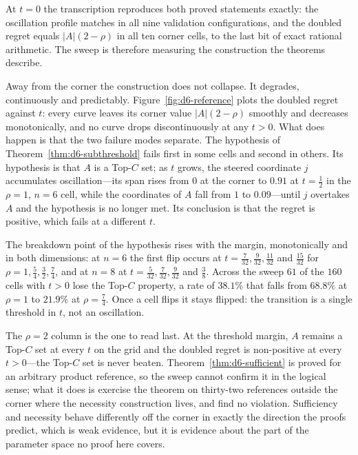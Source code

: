 At $t=0$ the transcription reproduces both proved statements exactly: the oscillation profile
matches  in all nine validation configurations, and the doubled regret
equals $|A|(2-\rho)$ in all ten corner cells, to the last bit of exact rational arithmetic.
The sweep is therefore measuring the construction the theorems describe.

Away from the corner the construction does not collapse. It degrades, continuously and
predictably. Figure~\ref{fig:d6-reference} plots the doubled regret against $t$: every curve
leaves its corner value $|A|(2-\rho)$ smoothly and decreases monotonically, and no curve
drops discontinuously at any $t>0$. What does happen is that the two failure modes separate.
The hypothesis of Theorem~\ref{thm:d6-subthreshold} fails first in some cells and second in
others. Its hypothesis is that $A$ is a Top-$C$ set; as $t$ grows, the steered coordinate $j$
accumulates oscillation---its span rises from $0$ at the corner to $0.91$ at $t=\tfrac12$ in
the $\rho=1$, $n=6$ cell, while the coordinates of $A$ fall from $1$ to $0.09$---until $j$
overtakes $A$ and the hypothesis is no longer met. Its conclusion is that the regret is
positive, which fails at a different $t$.

The breakdown point of the hypothesis rises with the margin, monotonically and in both
dimensions: at $n=6$ the first flip occurs at $t=\tfrac{7}{32},\tfrac{9}{32},\tfrac{11}{32}$
and $\tfrac{15}{32}$ for $\rho=1,\tfrac54,\tfrac32,\tfrac74$, and at $n=8$ at
$t=\tfrac{5}{32},\tfrac{7}{32},\tfrac{9}{32}$ and $\tfrac38$. Across the sweep $61$ of the
$160$ cells with $t>0$ lose the Top-$C$ property, a rate of $38.1\%$ that falls from $68.8\%$
at $\rho=1$ to $21.9\%$ at $\rho=\tfrac74$. Once a cell flips it stays flipped: the
transition is a single threshold in $t$, not an oscillation. \NUM{}

The $\rho=2$ column is the one to read last. At the threshold margin, $A$ remains a Top-$C$
set at every $t$ on the grid and the doubled regret is non-positive at every $t>0$---the
Top-$C$ set is never beaten. Theorem~\ref{thm:d6-sufficient} is proved for an arbitrary product
reference, so the sweep cannot confirm it in the logical sense; what it does is exercise the
theorem on thirty-two references outside the corner where the necessity construction lives,
and find no violation. Sufficiency and necessity behave differently off the corner in exactly
the direction the proofs predict, which is weak evidence, but it is evidence about the part of
the parameter space no proof here covers.

